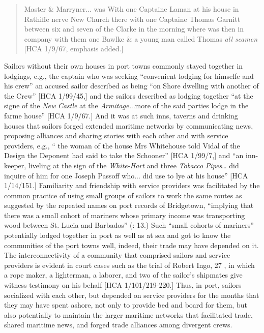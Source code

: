 \begin{quotation}
Master \& Marryner... was With one Captaine Laman at his house in Rathiffe nerve New Church there with one Captaine Thomas Garnitt between six and seven of the Clarke in the morning where was then in company with them one Bawlke \& a young man called Thomas \textit{all} \textit{seamen} [HCA 1/9/67, emphasis added.] \end{quotation}

Sailors without their own houses in port towns commonly stayed together in lodgings, e.g., the captain who was seeking “convenient lodging for himselfe and his crew” \citep[11,]{Gage1648} an accused sailor described as being “on Shore dwelling with another of the Crew” [HCA 1/99/45,] and the sailors described as lodging together “at the signe of the \textit{New} \textit{Castle} at the \textit{Armitage.}..more of the said parties lodge in the farme house” [HCA 1/9/67.] And it was at such inns, taverns and drinking houses that sailors forged extended maritime networks by communicating news, proposing alliances and sharing stories with each other and with service providers, e.g., “ the woman of the house Mrs Whitehouse told Vidal of the Design the Deponent had said to take the Schooner” [HCA 1/99/7,] and “an inn-keeper, liveling at the sign of the \textit{White-Hart} and three \textit{Tobacco} \textit{Pipes}… did inquire of him for one Joseph Passoff who... did use to lye at his house” [HCA 1/14/151.] Familiarity and friendship with service providers was facilitated by the common practice of using small groups of sailors to work the same routes as suggested by the repeated names on port records of Bridgetown, “implying that there was a small cohort of mariners whose primary income was transporting wood between St. Lucia and Barbados” (\citealt{Draper2016}: 13.) Such “small cohorts of mariners” potentially lodged together in port as well as at sea and got to know the communities of the port towns well, indeed, their trade may have depended on it. The interconnectivity of a community that comprised sailors and service providers is evident in court cases such as the trial of Robert Ingo, 27 \citealt{May1636}, in which a rope maker, a lighterman, a laborer, and two of the sailor’s shipmates give witness testimony on his behalf [HCA 1/101/219-220.] Thus, in port, sailors socialized with each other, but depended on service providers for the months that they may have spent ashore, not only to provide bed and board for them, but also potentially to maintain the larger maritime networks that facilitated trade, shared maritime news, and forged trade alliances among divergent crews. 

